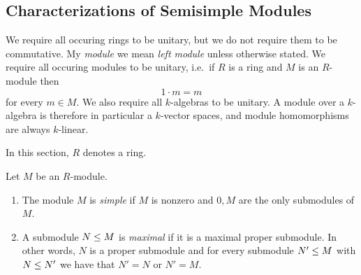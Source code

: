 \subsection{Characterizations of Semisimple Modules}


\begin{conventions}
  We require all occuring rings to be unitary, but we do not require them to be commutative.
  My \emph{module} we mean \emph{left module} unless otherwise stated.
  We require all occuring modules to be unitary, i.e.\ if $R$ is a ring and $M$ is an $R$-module then
  \[
      1 \cdot m
    = m
  \]
  for every $m \in M$.
  We also require all $k$-algebras to be unitary.
  A module over a $k$-algebra is therefore in particular a $k$-vector spaces, and module homomorphisms are always $k$-linear.
\end{conventions}


\begin{conventions}
  In this section, $R$ denotes a ring.
\end{conventions}


\begin{definition}
  \label{definition: simple and maximal modules}
  Let $M$ be an $R$-module.
  \begin{enumerate}
    \item
      The module $M$ is \emph{simple} if $M$ is nonzero and $0, M$ are the only submodules of $M$.
    \item
      A submodule $N \leq M$ is \emph{maximal} if it is a maximal proper submodule.
      In other words, $N$ is a proper submodule and for every submodule $N' \leq M$ with $N \leq N'$ we have that $N' = N$ or $N' = M$.
  \end{enumerate}
\end{definition}


